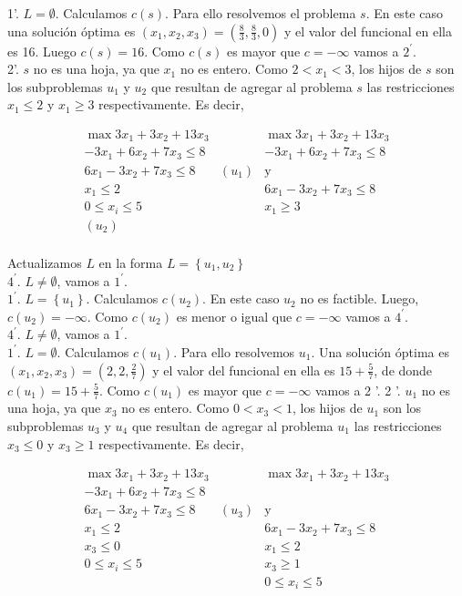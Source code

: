 \documentclass[10pt]{article}
\begin{document}
1'. $L=\emptyset$. Calculamos $c(s)$. Para ello resolvemos el problema $s$. En este caso una solución óptima es $\left(x_{1}, x_{2}, x_{3}\right)=\left(\frac{8}{3}, \frac{8}{3}, 0\right)$ y el valor del funcional en ella es 16. Luego $c(s)=16$. Como $c(s)$ es mayor que $c=-\infty$ vamos a $2^{\prime}$.\\
2'. $s$ no es una hoja, ya que $x_{1}$ no es entero. Como $2<x_{1}<3$, los hijos de $s$ son los subproblemas $u_{1}$ y $u_{2}$ que resultan de agregar al problema $s$ las restricciones $x_{1} \leq 2$ y $x_{1} \geq 3$ respectivamente. Es decir,

$$
\begin{array}{ccc}
\max 3 x_{1}+3 x_{2}+13 x_{3} & & \max 3 x_{1}+3 x_{2}+13 x_{3} \\
-3 x_{1}+6 x_{2}+7 x_{3} \leq 8 & & -3 x_{1}+6 x_{2}+7 x_{3} \leq 8 \\
6 x_{1}-3 x_{2}+7 x_{3} \leq 8 & \left(u_{1}\right) & \mathrm{y} \\
x_{1} \leq 2 & & 6 x_{1}-3 x_{2}+7 x_{3} \leq 8 \\
0 \leq x_{i} \leq 5 & & x_{1} \geq 3 \\
\left(u_{2}\right) \\
\end{array}
$$

Actualizamos $L$ en la forma $L=\left\{u_{1}, u_{2}\right\}$\\
$4^{\prime}$. $L \neq \emptyset$, vamos a $1^{\prime}$.\\
$1^{\prime}$. $L=\left\{u_{1}\right\}$. Calculamos $c\left(u_{2}\right)$. En este caso $u_{2}$ no es factible. Luego, $c\left(u_{2}\right)=-\infty$. Como $c\left(u_{2}\right)$ es menor o igual que $c=-\infty$ vamos a $4^{\prime}$.\\
$4^{\prime}$. $L \neq \emptyset$, vamos a $1^{\prime}$.\\
$1^{\prime}$. $L=\emptyset$. Calculamos $c\left(u_{1}\right)$. Para ello resolvemos $u_{1}$. Una solución óptima es $\left(x_{1}, x_{2}, x_{3}\right)=\left(2,2, \frac{2}{7}\right)$ y el valor del funcional en ella es $15+\frac{5}{7}$, de donde $c\left(u_{1}\right)=15+\frac{5}{7}$. Como $c\left(u_{1}\right)$ es mayor que $c=-\infty$ vamos a 2 '. 2 '. $u_{1}$ no es una hoja, ya que $x_{3}$ no es entero. Como $0<x_{3}<1$, los hijos de $u_{1}$ son los subproblemas $u_{3}$ y $u_{4}$ que resultan de agregar al problema $u_{1}$ las restricciones $x_{3} \leq 0$ y $x_{3} \geq 1$ respectivamente. Es decir,

\[
\begin{array}{ccc}
\max 3 x_{1}+3 x_{2}+13 x_{3} & & \max 3 x_{1}+3 x_{2}+13 x_{3} \\
-3 x_{1}+6 x_{2}+7 x_{3} \leq 8 & & \\
6 x_{1}-3 x_{2}+7 x_{3} \leq 8 & \left(u_{3}\right) & \mathrm{y} \\
x_{1} \leq 2 & & 6 x_{1}-3 x_{2}+7 x_{3} \leq 8  \tag{4}\\
x_{3} \leq 0 & & x_{1} \leq 2 \\
0 \leq x_{i} \leq 5 & & x_{3} \geq 1 \\
& & 0 \leq x_{i} \leq 5
\end{array}
\]
\end{document}
